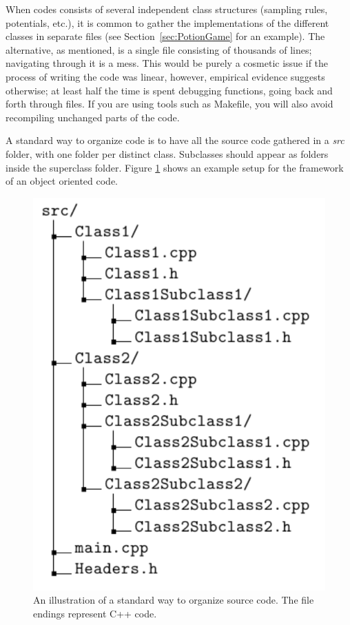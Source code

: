 When codes consists of several independent class structures (sampling rules, potentials, etc.), it is common to gather the implementations of the different classes in separate files (see Section~\ref{sec:PotionGame} for an example). The alternative, as mentioned, is a single file consisting of thousands of lines; navigating through it is a mess. This would be purely a cosmetic issue if the process of writing the code was linear, however, empirical evidence suggests otherwise; at least half the time is spent debugging functions, going back and forth through files. If you are using tools such as Makefile, you will also avoid recompiling unchanged parts of the code.

A standard way to organize code is to have all the source code gathered in a \textit{src} folder, with one folder per distinct class. Subclasses should appear as folders inside the superclass folder. Figure \ref{FIG:SRCdirTree} shows an example setup for the framework of an object oriented code.

\begin{figure}
 
 \begin{center}
  \includegraphics[scale=0.6]{../Graphics/SRCfolderStruct.pdf} 
 \end{center}

 \caption{An illustration of a standard way to organize source code. The file endings represent C++ code.}
 \label{FIG:SRCdirTree}
\end{figure}


